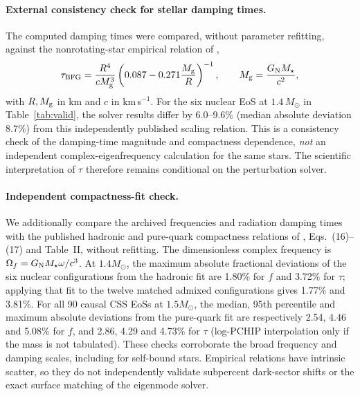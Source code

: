 \documentclass[11pt,a4paper]{article}
\newcommand{\Msun}{M_\odot}
\begin{document}
\paragraph{External consistency check for stellar damping times.}
The computed damping times were compared, without parameter refitting, against the nonrotating-star empirical relation of \citet{Benhar04},
\begin{equation}
\tau_{\rm BFG}=\frac{R^4}{cM_{\rm g}^3}
\left(0.087-0.271\frac{M_{\rm g}}{R}\right)^{-1},
\qquad M_{\rm g}=\frac{G_{\rm N}M_\star}{c^2},
\end{equation}
with $R,M_{\rm g}$ in km and $c$ in km\,s$^{-1}$. For the six nuclear EoS at $1.4\,\Msun$ in Table~\ref{tab:valid}, the solver results differ by 6.0--9.6\% (median absolute deviation 8.7\%) from this independently published scaling relation. This is a consistency check of the damping-time magnitude and compactness dependence, \emph{not} an independent complex-eigenfrequency calculation for the same stars. The scientific interpretation of $\tau$ therefore remains conditional on the perturbation solver.

\paragraph{Independent compactness-fit check.} We additionally compare the archived frequencies and radiation damping times with the published hadronic and pure-quark compactness relations of \citet{ZhaoLattimer22}, Eqs.~(16)--(17) and Table~II, without refitting. The dimensionless complex frequency is $\Omega_f=G_{\rm N}M_\star\omega/c^3$. At $1.4\Msun$, the maximum absolute fractional deviations of the six nuclear configurations from the hadronic fit are 1.80\% for $f$ and 3.72\% for $\tau$; applying that fit to the twelve matched admixed configurations gives 1.77\% and 3.81\%. For all 90 causal CSS EoSs at $1.5\Msun$, the median, 95th percentile and maximum absolute deviations from the pure-quark fit are respectively 2.54, 4.46 and 5.08\% for $f$, and 2.86, 4.29 and 4.73\% for $\tau$ (log-PCHIP interpolation only if the mass is not tabulated). These checks corroborate the broad frequency and damping scales, including for self-bound stars. Empirical relations have intrinsic scatter, so they do not independently validate subpercent dark-sector shifts or the exact surface matching of the eigenmode solver.
\end{document}
